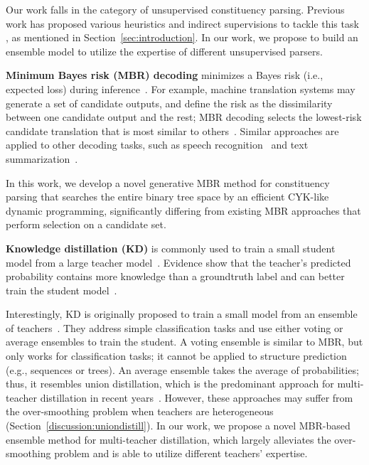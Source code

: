 \documentclass{article}
\begin{document}
Our work falls in the category of unsupervised constituency parsing. Previous work has proposed various heuristics and indirect supervisions to tackle this task \citep{snyder2009unsupervised,kim-etal-2019-compound,drozdov-etal-2019-unsupervised-latent}, as mentioned in Section~\ref{sec:introduction}.
In our work, we propose to build an ensemble model to utilize the expertise of different unsupervised parsers.

\textbf{Minimum Bayes risk (MBR) decoding} minimizes a Bayes risk (i.e., expected loss) during inference~\citep{MBRbook}. For example, machine translation systems may generate a set of candidate outputs, and define the risk as the dissimilarity between one candidate output and the rest; MBR decoding selects the lowest-risk candidate translation that is most similar to others~\citep{kumar-byrne-2004-minimum,10.1162/tacl_a_00491,suzgun-etal-2023-follow}. Similar approaches are applied to other decoding tasks, such as speech recognition~\citep{inproceedingsspeechrecognition} and text summarization~\citep{suzgun-etal-2023-follow}.

In this work, we develop a novel generative MBR method for constituency parsing that searches the entire binary tree space by an efficient CYK-like dynamic programming, significantly differing from existing MBR approaches that perform selection on a candidate set.

\textbf{Knowledge distillation (KD)} is commonly used to train a small student model from a large teacher model~\citep{sun-etal-2019-patient,jiao-etal-2020-tinybert}. Evidence show that the teacher's predicted probability contains more knowledge than a groundtruth label and can better train the student model~\citep{hinton2015distilling,wen-etal-2023-f}.

Interestingly, KD is originally proposed to train a small model from an ensemble of teachers~\citep{KDoriginal,hinton2015distilling}. They address simple classification tasks and use either voting or average ensembles to train the student. A voting ensemble is similar to MBR, but only works for classification tasks; it cannot be applied to structure prediction (e.g., sequences or trees). An average ensemble takes the average of probabilities; thus, it resembles union distillation, which is the predominant approach for multi-teacher distillation in recent years~\citep{wu-etal-2021-one,yang2020model}.
However, these approaches may suffer from the over-smoothing problem when teachers are heterogeneous (Section~\ref{discussion:uniondistill}).
In our work, we propose a novel MBR-based ensemble method for multi-teacher distillation, which largely alleviates the over-smoothing problem and is able to utilize different teachers' expertise.
\end{document}
